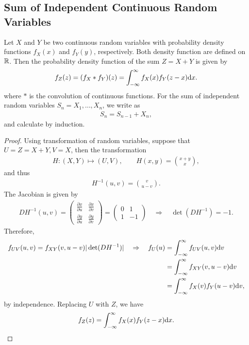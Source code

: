 \subsection*{Sum of Independent Continuous Random Variables}


\begin{theorem}
	\label{thrm:4}
	Let $X$ and $Y$ be two continuous random variables with probability density functions $f_X(x)$ and $f_Y(y)$, respectively. Both density function are defined on $\mathbb{R}$. Then the probability density function of the sum $Z = X + Y$ is given by
	\begin{align*}
	f_Z(z) = (f_X * f_Y)(z) = \int_{-\infty}^{\infty} f_X(x) f_Y(z-x) \mathrm{d}x.
	\end{align*}
	where $*$ is the convolution of continuous functions. For the sum of independent random variables $S_n = X_1, \ldots, X_n$, we write as
	\begin{align*}
	S_n = S_{n-1} + X_n,
	\end{align*}
	and calculate by induction.
\end{theorem}
\begin{proof}
	Using transformation of random variables, suppose that $U = Z = X + Y, V = X$, then the transformation 
	\begin{align*}
	H: (X, Y)\mapsto (U, V), \qquad H(x, y) = \binom{x+y}{x},
	\end{align*}
	and thus
	\begin{align*}
	H^{-1}(u, v) = \binom{v}{u-v}.
	\end{align*}
	The Jacobian is given by
	\begin{align*}
	DH^{-1}(u, v) = \begin{pmatrix}
	\frac{\partial x}{\partial u} & \frac{\partial x}{\partial v} \\
	\frac{\partial y}{\partial u} & \frac{\partial y}{\partial v}
	\end{pmatrix} = \begin{pmatrix}
	0 & 1 \\
	1 & -1
	\end{pmatrix} \quad \Rightarrow\quad \det(DH^{-1}) = -1.
	\end{align*}
	Therefore,
	\begin{align*}
	f_{UV}(u, v) = f_{XY}(v, u-v) |\det(DH^{-1})| \quad\Rightarrow\quad f_{U}(u) & = \int_{-\infty}^{\infty} f_{UV}(u, v)\mathrm{d}v \\
	& = \int_{-\infty}^{\infty} f_{XY}(v, u-v) \mathrm{d}v \\
	& = \int_{-\infty}^{\infty} f_X(v) f_Y(u-v) \mathrm{d}v,
	\end{align*}
	by independence. Replacing $U$ with $Z$, we have
	\begin{align*}
	f_Z(z) = \int_{-\infty}^{\infty} f_X(x)f_Y(z-x)\mathrm{d}x.
	\end{align*}
\end{proof}

